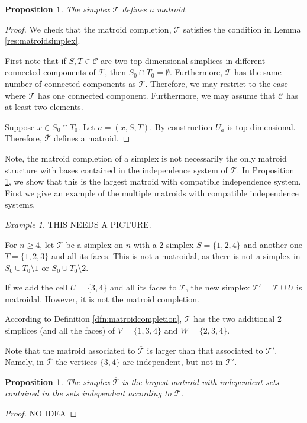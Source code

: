 \documentclass[11pt]{article}
\newcommand{\sC}{\mathscr{C}}
\newcommand{\cT}{\mathcal{T}}
\newtheorem{prop}[thm]{Proposition}
\theoremstyle{remark}
\newtheorem{eg}[thm]{Example}
\theoremstyle{definition}
\begin{document}
\begin{prop}
The simplex $\overline{\cT}$ defines a matroid.
\end{prop}
\begin{proof}
	We check that the matroid completion, $\overline{\cT}$ satisfies the condition in Lemma \ref{res:matroidsimplex}. 
	
	First note that if $S, T \in \sC$ are two top dimensional simplices in different connected components of $\cT$, then $S_0 \cap T_0  =\emptyset$. Furthermore, $\cT$ has the same number of connected components as $\cT$. Therefore, we may restrict to the case where $\cT$ has one connected component. Furthermore, we may assume that $\sC$ has at least two elements. 
	
	Suppose $x \in S_0 \cap T_0$. Let $a = (x, S, T)$. By construction $U_a$ is top dimensional. Therefore, $\overline{\cT}$ defines a matroid.
\end{proof}

Note, the matroid completion of a simplex is not necessarily the only matroid structure with bases contained in the independence system of $\cT$. In Proposition \ref{res:completionbiggest}, we show that this is the largest matroid with compatible independence system. First we give an example of the multiple matroids with compatible independence systems. 

\begin{eg}
THIS NEEDS A PICTURE.

For $n \geq 4$, let $\cT$ be a simplex on $n$ with a $2$ simplex $S = \{1, 2, 4\}$ and another one $T = \{1, 2, 3\}$ and all its faces. This is not a matroidal, as there is not a simplex in $S_0 \cup T_0 \setminus 1$ or $S_0 \cup T_0 \setminus 2$. 

If we add the cell $U = \{3, 4\}$ and all its faces to $\cT$, the new simplex $\cT' = \cT \cup U$ is matroidal. However, it is not the matroid completion. 

According to Definition \ref{dfn:matroidcompletion}, $\overline{\cT}$ has the two additional $2$ simplices (and all the faces) of $V = \{1, 3,4 \}$ and $W  = \{2, 3,4 \}$. 

Note that the matroid associated to $\overline{\cT}$ is larger than that associated to $\cT'$. Namely, in $\overline{\cT}$ the vertices $\{3, 4\}$ are independent, but not in $\cT'$.
\end{eg}

\begin{prop}\label{res:completionbiggest}
The simplex $\overline{\cT}$ is the largest matroid with independent sets contained in the sets independent according to $\cT$.
\end{prop}
\begin{proof}
NO IDEA
\end{proof}
\end{document}

